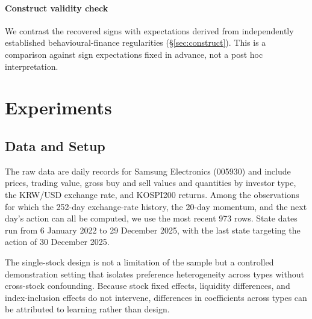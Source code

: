 \paragraph{Construct validity check}
We contrast the recovered signs with expectations derived from independently
established behavioural-finance regularities (\S\ref{sec:construct}). This is a
comparison against sign expectations fixed in advance, not a post hoc
interpretation.

\section{Experiments}
\label{sec:experiments}

\subsection{Data and Setup}
\label{sec:data}

The raw data are daily records for Samsung Electronics (005930) and include
prices, trading value, gross buy and sell values and quantities by investor
type, the KRW/USD exchange rate, and KOSPI200 returns. Among the observations
for which the 252-day exchange-rate history, the 20-day momentum, and the next
day's action can all be computed, we use the most recent 973 rows. State dates
run from 6 January 2022 to 29 December 2025, with the last state targeting the
action of 30 December 2025.

The single-stock design is not a limitation of the sample but a controlled
demonstration setting that isolates preference heterogeneity across types
without cross-stock confounding. Because stock fixed effects, liquidity
differences, and index-inclusion effects do not intervene, differences in
coefficients across types can be attributed to learning rather than design.

